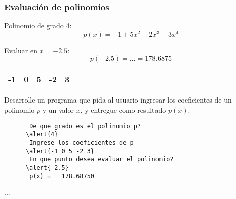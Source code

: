 \documentclass[10pt]{beamer}
\begin{document}
  \begin{frame}[fragile]
    \frametitle{Evaluación de polinomios}

    Polinomio de grado 4:
    \[ p(x) = -1 + 5x^2 - 2x^3 + 3x^4 \]
    \pause

    Evaluar en $x = -2.5$:
    \[ p(-2.5) = \dots = 178.6875 \]
    \pause

    \begin{tabular}{|c|c|c|c|c|}\hline
      -1 & 0 & 5 & -2 & 3 \\\hline
    \end{tabular}

\end{frame}

  \begin{frame}[fragile]
    Desarrolle un programa
    que pida al usuario ingresar
    los coeficientes de un polinomio $p$ y un valor $x$,
    y entregue como resultado $p(x)$.
    \begin{Verbatim}
       De que grado es el polinomio p?
      \alert{4}
       Ingrese los coeficientes de p
      \alert{-1 0 5 -2 3}
       En que punto desea evaluar el polinomio?
      \alert{-2.5}
       p(x) =   178.68750
    \end{Verbatim}

\end{frame}

  \begin{frame}
    
    ...
  \end{frame}
\end{document}
